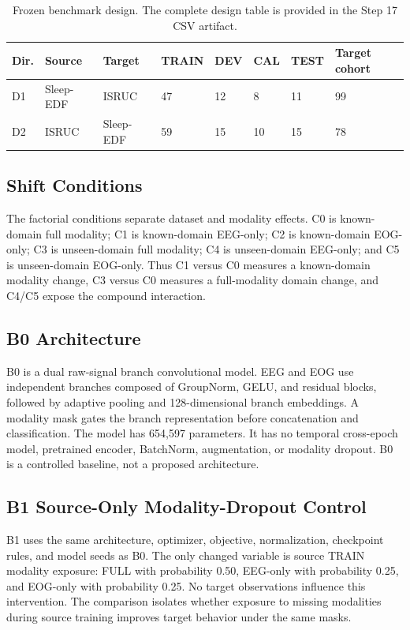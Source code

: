 \documentclass[11pt]{article}
\begin{document}
\begin{table}[t]
\centering\small
\caption{Frozen benchmark design. The complete design table is provided in the Step 17 CSV artifact.}
\label{tab:design}
\begin{tabular}{llllllll}
\toprule
Dir. & Source & Target & TRAIN & DEV & CAL & TEST & Target cohort\\
\midrule
D1 & Sleep-EDF & ISRUC & 47 & 12 & 8 & 11 & 99\\
D2 & ISRUC & Sleep-EDF & 59 & 15 & 10 & 15 & 78\\
\bottomrule
\end{tabular}
\end{table}

\subsection{Shift Conditions}
The factorial conditions separate dataset and modality effects. C0 is known-domain full modality; C1 is known-domain EEG-only; C2 is known-domain EOG-only; C3 is unseen-domain full modality; C4 is unseen-domain EEG-only; and C5 is unseen-domain EOG-only. Thus C1 versus C0 measures a known-domain modality change, C3 versus C0 measures a full-modality domain change, and C4/C5 expose the compound interaction.

\subsection{B0 Architecture}
B0 is a dual raw-signal branch convolutional model. EEG and EOG use independent branches composed of GroupNorm, GELU, and residual blocks, followed by adaptive pooling and 128-dimensional branch embeddings. A modality mask gates the branch representation before concatenation and classification. The model has 654,597 parameters. It has no temporal cross-epoch model, pretrained encoder, BatchNorm, augmentation, or modality dropout. B0 is a controlled baseline, not a proposed architecture.

\subsection{B1 Source-Only Modality-Dropout Control}
B1 uses the same architecture, optimizer, objective, normalization, checkpoint rules, and model seeds as B0. The only changed variable is source TRAIN modality exposure: FULL with probability 0.50, EEG-only with probability 0.25, and EOG-only with probability 0.25. No target observations influence this intervention. The comparison isolates whether exposure to missing modalities during source training improves target behavior under the same masks.
\end{document}
